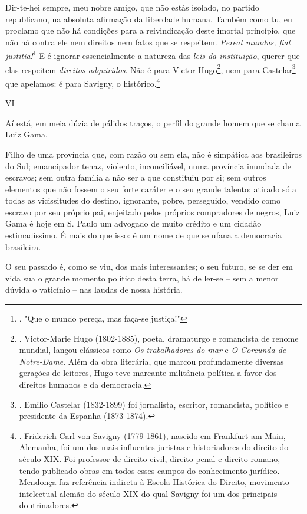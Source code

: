 Dir-te-hei sempre, meu nobre amigo, que não estás isolado, no partido
republicano, na absoluta afirmação da liberdade humana. Também como tu,
eu proclamo que não há condições para a reivindicação deste imortal
princípio, que não há contra ele nem direitos nem fatos que se
respeitem. \emph{Pereat mundus, fiat justitia!}\footnote{. "Que o mundo
  pereça, mas faça-se justiça!"} E é ignorar essencialmente a natureza
das \emph{leis da instituição}, querer que elas respeitem \emph{direitos
adquiridos}. Não é para Victor Hugo\footnote{. Victor-Marie Hugo
  (1802-1885), poeta, dramaturgo e romancista de renome mundial, lançou
  clássicos como \emph{Os trabalhadores do mar} e \emph{O Corcunda de
  Notre-Dame}. Além da obra literária, que marcou profundamente diversas
  gerações de leitores, Hugo teve marcante militância política a favor
  dos direitos humanos e da democracia.}, nem para Castelar\footnote{.
  Emilio Castelar (1832-1899) foi jornalista, escritor, romancista,
  político e presidente da Espanha (1873-1874).} que apelamos: é para
Savigny, o histórico.\footnote{. Friderich Carl von Savigny (1779-1861),
  nascido em Frankfurt am Main, Alemanha, foi um dos mais influentes
  juristas e historiadores do direito do século XIX. Foi professor de
  direito civil, direito penal e direito romano, tendo publicado obras
  em todos esses campos do conhecimento jurídico. Mendonça faz
  referência indireta à Escola Histórica do Direito, movimento
  intelectual alemão do século XIX do qual Savigny foi um dos principais
  doutrinadores.}

VI

Aí está, em meia dúzia de pálidos traços, o perfil do grande homem que
se chama Luiz Gama.

Filho de uma província que, com razão ou sem ela, não é simpática aos
brasileiros do Sul; emancipador tenaz, violento, inconciliável, numa
província inundada de escravos; sem outra família a não ser a que
constituiu por si; sem outros elementos que não fossem o seu forte
caráter e o seu grande talento; atirado só a todas as vicissitudes do
destino, ignorante, pobre, perseguido, vendido como escravo por seu
próprio pai, enjeitado pelos próprios compradores de negros, Luiz Gama é
hoje em S. Paulo um advogado de muito crédito e um cidadão
estimadíssimo. É mais do que isso: é um nome de que se ufana a
democracia brasileira.

O seu passado é, como se viu, dos mais interessantes; o seu futuro, se
se der em vida sua o grande momento político desta terra, há de ler-se
-- sem a menor dúvida o vaticínio -- nas laudas de nossa história.

